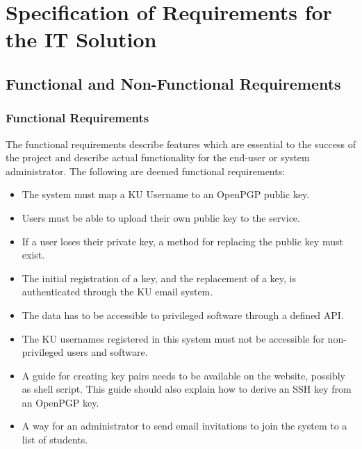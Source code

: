 \documentclass[11pt,a4paper]{report}
\begin{document}
\renewcommand{\thesubsection}{\thesection.\alph{subsection}}
\section{Specification of Requirements for the IT Solution}\label{sec:Requirements}
\subsection{Functional and Non-Functional Requirements}
\subsubsection{Functional Requirements}\label{subsubsec:Functional_Req}
The functional requirements describe features which are essential to the success of the project and describe actual functionality for the end-user or system administrator. The following are deemed functional requirements:
\begin{itemize}
\item The system must map a KU Username to an OpenPGP public key.
\item Users must be able to upload their own public key to the service.
\item If a user loses their private key, a method for replacing the public key must exist.
\item The initial registration of a key, and the replacement of a key, is authenticated through the KU email system.
\item The data has to be accessible to privileged software through a defined API.
\item The KU usernames registered in this system must not be accessible for non-privileged users and software.
\item A guide for creating key pairs needs to be available on the website, possibly as shell script. This guide should also explain how to derive an SSH key from an OpenPGP key.
\item A way for an administrator to send email invitations to join the system to a list of students.
\end{itemize}
\end{document}
